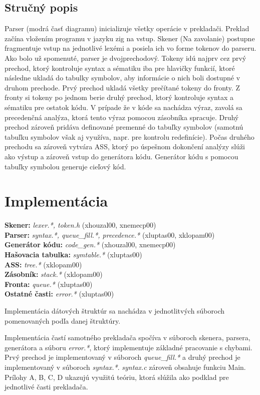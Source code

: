 \documentclass[Slovak, a4paper, 12pt]{article}
\begin{document}
	\subsection{Stručný popis}
	Parser (modrá časť diagramu) inicializuje všetky operácie v prekladači.  
	Preklad začína vložením programu v jazyku zig na
	 vstup. Skener (Na zavolanie) postupne fragmentuje vstup na jednotlivé lexémi a posiela ich vo forme tokenov do parseru.  Ako bolo už spomenuté, parser je dvojprechodový. Tokeny idú najprv cez prvý prechod, ktorý kontroluje syntax a sématiku iba pre hlavičky funkcií, ktoré následne ukladá do tabulky symbolov, aby informácie o nich boli dostupné v druhom prechode. Prvý prechod ukladá všetky prečítané tokeny do fronty. Z fronty si tokeny po jednom berie druhý prechod, ktorý kontroluje syntax a sématiku pre ostatok kódu. V prípade že v kóde sa nachádza výraz, zavolá sa precedenčná analýza, ktorá tento výraz pomocou zásobníka spracuje. Druhý prechod zároveň pridáva definované premenné do tabuľky symbolov  (samotnú tabuľku symbolov však aj využíva, napr. pre kontrolu redefinície).  Počas druhého prechodu sa zároveň vytvára ASS, ktorý po úspešnom dokončení analýzy slúži ako výstup a zároveň vstup do generátora kódu. Generátor kódu s pomocou tabuľky symbolou generuje cieľový kód.
	 	
	\newpage
	\section{Implementácia}
	\textbf{Skener: }\textit{lexer.*, token.h} (xhouzal00, xnemecp00)\\ 
	\textbf{Parser: }\textit{syntax.*, queue\_fill.*, precedence.*} (xluptas00, xklopam00)\\
	\textbf{Generátor kódu: }\textit{code\_gen.*} (xhouzal00, xnemecp00)\\
	\textbf{Hašovacia tabulka: }\textit{symtable.*} (xluptas00)\\
	\textbf{ASS: }\textit{tree.*} (xklopam00)\\
	\textbf{Zásobník: }\textit{stack.*} (xklopam00)\\
	\textbf{Fronta: }\textit{queue.*} (xluptas00)\\
	\textbf{Ostatné časti: }\textit{error.*} (xluptas00)\\
	\par Implementácia dátových štruktúr sa nachádza v jednotlitvých súboroch pomenovaných podľa danej štruktúry.
	\par Implementácia častí samotného prekladača spočíva v súboroch skenera, parsera, generátora a súboru \textit{error.*}, ktorý 
	implementuje základné pracovanie s chybami. Prvý prechod je implementovaný v súboroch \textit{queue\_fill.*} a druhý prechod je
	implementovaný v súboroch \textit{syntax.*}. \textit{syntax.c} zároveň obsahuje funkciu Main. Prílohy A, B, C, D ukazujú využitú teóriu, ktorá slúžila ako podklad pre jednotlivé časti prekladača.
\end{document}
